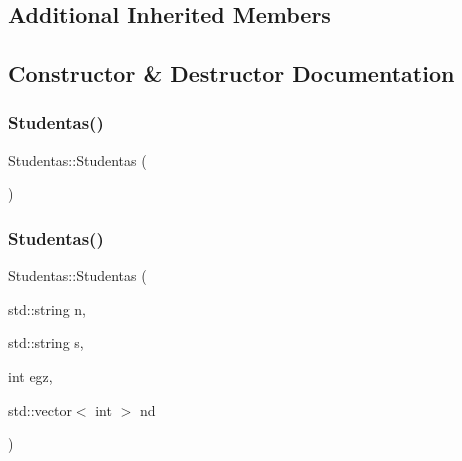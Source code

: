 \subsection*{Additional Inherited Members}


\subsection{Constructor \& Destructor Documentation}
\mbox{\label{class_studentas_ab459e995e8c9b24cdc9aec5b09a66539}} 
\subsubsection{\texorpdfstring{Studentas()}{Studentas()}\hspace{0.1cm}{\footnotesize\ttfamily [1/3]}}
{\footnotesize\ttfamily Studentas\+::\+Studentas (\begin{DoxyParamCaption}{ }\end{DoxyParamCaption})\hspace{0.3cm}{\ttfamily [inline]}}

\mbox{\label{class_studentas_a16954773ebaae3c8e5359a7c52564775}} 
\subsubsection{\texorpdfstring{Studentas()}{Studentas()}\hspace{0.1cm}{\footnotesize\ttfamily [2/3]}}
{\footnotesize\ttfamily Studentas\+::\+Studentas (\begin{DoxyParamCaption}\item[{std\+::string}]{n,  }\item[{std\+::string}]{s,  }\item[{int}]{egz,  }\item[{std\+::vector$<$ int $>$}]{nd }\end{DoxyParamCaption})\hspace{0.3cm}{\ttfamily [inline]}}

\mbox{\label{class_studentas_a63e449e0f51a0b14340d02ee71b4be23}} 
